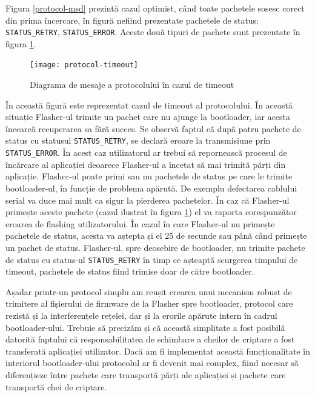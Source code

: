 \documentclass[12pt,a4paper,titlepage]{report}
\begin{document}
Figura \ref{protocol-msd} prezintă cazul optimist, când toate pachetele sosesc corect din prima încercare, în figură nefiind prezentate pachetele de status: \texttt{STATUS\_RETRY}, \texttt{STATUS\_ERROR}. Aceste două tipuri de pachete sunt prezentate în figura \ref{protocol-msd-timeout}.

\begin{figure}[h]
    \centering
    \texttt{[image: protocol-timeout]}
    \caption{Diagrama de mesaje a protocolului în cazul de timeout}
    \label{protocol-msd-timeout}
\end{figure}

În această figură este reprezentat cazul de timeout al protocolului. În această situație Flasher-ul trimite un pachet care nu ajunge la bootloader, iar acesta încearcă recuperarea sa fără succes. Se observă faptul că după patru pachete de status cu statusul \texttt{STATUS\_RETRY}, se declară eroare la transmisiune prin \texttt{STATUS\_ERROR}. În acest caz utilizatorul ar trebui să repornească procesul de încărcare al aplicației deoarece Flasher-ul a încetat să mai trimită părți din aplicație. Flasher-ul poate primi sau nu pachetele de status pe care le trimite bootloader-ul, în funcție de problema apărută. De exemplu defectarea cablului serial va duce mai mult ca sigur la pierderea pachetelor. În caz că Flasher-ul primește aceste pachete (cazul ilustrat în figura \ref{protocol-msd-timeout}) el va raporta corespunzător eroarea de flashing utilizatorului. În cazul în care Flasher-ul nu primește pachetele de status, acesta va aștepta și el 25 de secunde sau până când primește un pachet de status. Flasher-ul, spre deosebire de bootloader, nu trimite pachete de status cu status-ul \texttt{STATUS\_RETRY} în timp ce așteaptă scurgerea timpului de timeout, pachetele de status fiind trimise doar de către bootloader.

Așadar printr-un protocol simplu am reușit crearea unui mecanism robust de trimitere al fișierului de firmware de la Flasher spre bootloader, protocol care rezistă și la interferențele rețelei, dar și la erorile apărute intern în cadrul bootloader-ului. Trebuie să precizăm și că această simplitate a fost posibilă datorită faptului că responsabilitatea de schimbare a cheilor de criptare a fost transferată aplicației utilizator. Dacă am fi implementat această funcționalitate în interiorul bootloader-ului protocolul ar fi devenit mai complex, fiind necesar să diferențieze între pachete care transportă părți ale aplicației și pachete care transportă chei de criptare.
\end{document}
